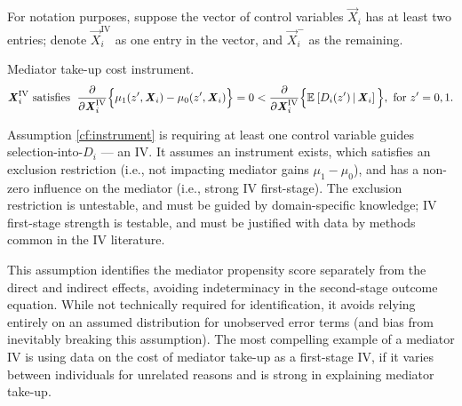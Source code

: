 For notation purposes, suppose the vector of control variables $\vec X_i$ has at least two entries;
denote $\vec X_i^{\text{IV}}$ as one entry in the vector, and $\vec X_i^-$ as the remaining.
\begin{assumptionCF}
    \label{cf:instrument}
    Mediator take-up cost instrument.
    \[ \boldsymbol{\mathit{X}}_i^{\text{IV}} \textnormal{ satisfies } \;
    \frac{\partial}{\partial\boldsymbol{\mathit{X}}_i^{\text{IV}}}\Big\{
        \mu_1(z', \boldsymbol{\mathit{X}}_i) - \mu_0(z', \boldsymbol{\mathit{X}}_i) \Big\} = 0
        < \frac{\partial}{\partial\boldsymbol{\mathit{X}}_i^{\text{IV}}}
        \Big\{
            \mathbb{E}_{} \left[ D_i(z') \, \middle\vert \, \boldsymbol{\mathit{X}}_i \right]\Big\},
        \textnormal{ for } z' = 0, 1. \]
\end{assumptionCF}
\noindent
Assumption \ref{cf:instrument} is requiring at least one control variable guides selection-into-$D_i$ --- an IV.
It assumes an instrument exists, which satisfies an exclusion restriction (i.e., not impacting mediator gains $\mu_1-\mu_0$), and has a non-zero influence on the mediator (i.e., strong IV first-stage).
The exclusion restriction is untestable, and must be guided by domain-specific knowledge; IV first-stage strength is testable, and must be justified with data by methods common in the IV literature.

This assumption identifies the mediator propensity score separately from the direct and indirect effects, avoiding indeterminacy in the second-stage outcome equation.
While not technically required for identification, it avoids relying entirely on an assumed distribution for unobserved error terms (and bias from inevitably breaking this assumption).
The most compelling example of a mediator IV is using data on the cost of mediator take-up as a first-stage IV, if it varies between individuals for unrelated reasons and is strong in explaining mediator take-up.

